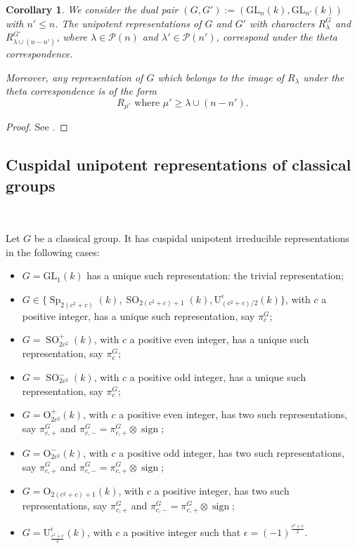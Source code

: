 \documentclass[12pt]{amsart}
\numberwithin{equation}{subsection}
\newtheorem{cor}[equation]{Corollary}
\newcommand{\cP}{\mathcal{P}}
\newcommand{\sign}{\operatorname{sign}}
\newcommand{\rU}{\mathrm{U}}
\newcommand{\GL}{\mathrm{GL}}
\newcommand{\Sp}{\operatorname{Sp}}
\newcommand{\SO}{\operatorname{SO}}
\def\rO{{\mathrm{O}}}
\begin{document}
\begin{cor} \label{cor:AKP2}
We consider the dual pair  $(G,G'):= (\GL_n(k),\GL_{n'}(k))$ with $n'\le n$. The unipotent representations of $G$ and $G'$
with characters $R^G_\lambda$ and $R^{G'}_{ \lambda\cup (n-n')}$, where $\lambda\in\cP(n)$ and $\lambda'\in\cP(n')$, correspond under the theta correspondence.

Moreover, any representation of $G$ which belongs to the image of $R_\lambda$ under the theta correspondence is of the form
\[ \text{$R_{\mu'}$ where $\mu'\ge \lambda\cup (n-n')$}.\]
\end{cor}
\begin{proof}
See \cite[Theorem~3]{AKP2}.
\end{proof}

\subsection{Cuspidal unipotent representations of classical groups} \label{subsec:CuspUnipt}\

Let $G$ be a classical group. It has cuspidal unipotent irreducible representations in the following cases:
\begin{itemize}
\item[$\bullet$]
$G=\GL_1(k)$ has a unique  such representation: the trivial representation;
\item[$\bullet$]
$G\in\{\Sp_{2(c^2+c)}(k),\SO_{2(c^2+c)+1}(k),\rU^\epsilon_{(c^2+c)/2}(k)\}$, with  $c$ a positive integer,  has a unique such representation, say $\pi^G_c$;
\item[$\bullet$]
$G=\SO_{2c^2}^+(k)$, with  $c$ a positive even integer, has a unique such representation, say $\pi^G_c$;
\item[$\bullet$]
$G=\SO_{2c^2}^-(k)$, with $c$ a positive  odd integer, has a unique such representation, say $\pi^G_c$;
\item[$\bullet$]
$G=\rO_{2c^2}^+(k)$,  with $c$  a positive even integer,  has two  such representations, say $\pi^G_{c,+}$ and $\pi^G_{c,-}=\pi^G_{c,+}\otimes\sign$;
\item[$\bullet$]
$G=\rO_{2c^2}^-(k)$, with $c$ a positive odd integer, has two  such representations, say $\pi^G_{c,+}$ and $\pi^G_{c,-}=\pi^G_{c,+}\otimes\sign$;
\item[$\bullet$]
$G=\rO_{2(c^2+c)+1}(k)$, with  $c$ a positive integer, has two  such representations, say $\pi^G_{c,+}$ and $\pi^G_{c,-}=\pi^G_{c,+}\otimes\sign$;
\item[$\bullet$]
$G=\rU^\epsilon_{\frac{c^2+c}{2}}(k)$, with  $c$ a positive integer such that $\epsilon=(-1)^{\frac{c^2+c}{2}}$.
\end{itemize}
\end{document}
